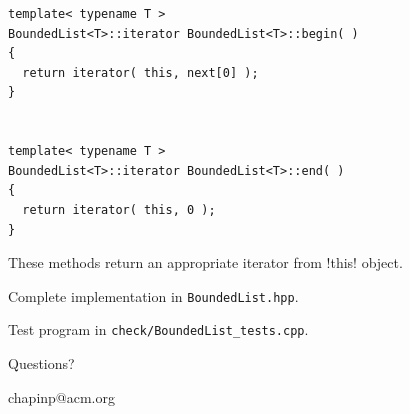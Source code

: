 \documentclass[landscape]{slides}
\begin{document}
{\small
\begin{lstlisting}
template< typename T >
BoundedList<T>::iterator BoundedList<T>::begin( )
{
  return iterator( this, next[0] );
}


template< typename T >
BoundedList<T>::iterator BoundedList<T>::end( )
{
  return iterator( this, 0 );
}
\end{lstlisting}
}
These methods return an appropriate iterator from !this! object.
\stopslide


\begin{citemize}
\item Complete implementation in \texttt{BoundedList.hpp}.
\item Test program in \texttt{check/BoundedList\_tests.cpp}.
\end{citemize}
\centerline{Questions?}
\makeatletter
\centerline{chapinp@acm.org}
\makeatother
\stopslide
\end{document}
